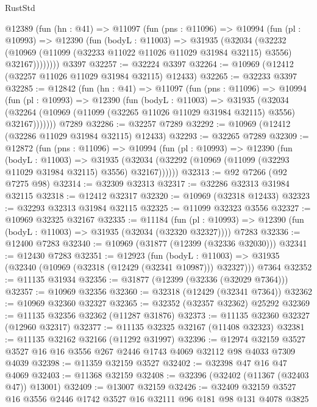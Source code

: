 \begin{lexlean}{RustStd}
\begin{coremodule}
    @12389
      (fun (hn : @41) =>
      @11097
        (fun (pns : @11096) =>
        @10994
          (fun (pl : @10993) =>
          @12390
            (fun (bodyL : @11003) =>
            @31935
              (@32034
                (@32232
                  (@10969 (@11099 (@32233 @11022 @11026 @11029 @31984 @32115) @3556) @32167))))))))
    @3397
@32257 := @32224 @3397
@32264 := @10969 (@12412 (@32257 @11026 @11029 @31984 @32115) @12433)
@32265 := @32233 @3397
@32285 := @12842
    (fun (hn : @41) =>
    @11097
      (fun (pns : @11096) =>
      @10994
        (fun (pl : @10993) =>
        @12390
          (fun (bodyL : @11003) =>
          @31935
            (@32034
              (@32264 (@10969 (@11099 (@32265 @11026 @11029 @31984 @32115) @3556) @32167)))))))
    @7289
@32286 := @32257 @7289
@32292 := @10969 (@12412 (@32286 @11029 @31984 @32115) @12433)
@32293 := @32265 @7289
@32309 := @12872
    (fun (pns : @11096) =>
    @10994
      (fun (pl : @10993) =>
      @12390
        (fun (bodyL : @11003) =>
        @31935 (@32034 (@32292 (@10969 (@11099 (@32293 @11029 @31984 @32115) @3556) @32167))))))
@32313 := @92 @7266 (@92 @7275 @98)
@32314 := @32309 @32313
@32317 := @32286 @32313 @31984 @32115
@32318 := @12412 @32317
@32320 := @10969 (@32318 @12433)
@32323 := @32293 @32313 @31984 @32115
@32325 := @11099 @32323 @3556
@32327 := @10969 @32325 @32167
@32335 := @11184
    (fun (pl : @10993) => @12390 (fun (bodyL : @11003) => @31935 (@32034 (@32320 @32327))))
    @7283
@32336 := @12400 @7283
@32340 := @10969 (@31877 (@12399 (@32336 @32030)))
@32341 := @12430 @7283
@32351 := @12923
    (fun (bodyL : @11003) => @31935 (@32340 (@10969 (@32318 (@12429 (@32341 @10987))) @32327)))
    @7364
@32352 := @11135 @31934
@32356 := @31877 (@12399 (@32336 (@32029 @7364)))
@32357 := @10969 @32356
@32360 := @32318 (@12429 (@32341 @7364))
@32362 := @10969 @32360 @32327
@32365 := @32352 (@32357 @32362) @25292
@32369 := @11135 @32356 @32362 (@11287 @31876)
@32373 := @11135 @32360 @32327 (@12960 @32317)
@32377 := @11135 @32325 @32167 (@11408 @32323)
@32381 := @11135 @32162 @32166 (@11292 @31997)
@32396 := @12974
    @32159
    @3527
    @3527
    @16
    @16
    @3556
    @267
    @2446
    @1743
    @4069
    @32112
    @98
    @4033
    @7309
    @4039
@32398 := @11359 @32159 @3527
@32402 := @32398 @47 @16 @47 @4069
@32403 := @11368 @32159
@32408 := @32396 (@32402 (@11367 (@32403 @47)) @13001)
@32409 := @13007 @32159
@32426 := @32409
    @32159
    @3527
    @16
    @3556
    @2446
    @1742
    @3527
    @16
    @32111
    @96
    @181
    @98
    @131
    @4078
    @3825

\end{coremodule}
\end{lexlean}
